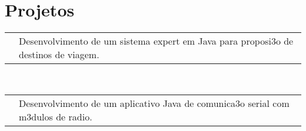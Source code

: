 \documentclass[11pt,a4paper,sans]{moderncv}
\makeatletter
\renewcommand*{\cvline}[3][.25em]{%
	  \begin{tabular}{@{}p{\hintscolumnwidth}@{\hspace{\separatorcolumnwidth}}p{\maincolumnwidth}@{}}%
          \centering\hintfont{#2} &{#3}%
	  \end{tabular}\\[#1]}
\makeatother
\begin{document}
\section{Projetos}
\cvline{Intelig\xc3\xaancia Artificial}{Desenvolvimento de um sistema expert em Java para proposi\xc3\xa7\xc3\xa3o de destinos de viagem. \newline{\emph{Implementa\xc3\xa7\xc3\xa3o dos m\xc3\xa9todos de encadeamento e desenvolvimento da interface gr\xc3\xa1\xef\xac\x81ca em Swing}} \newline{\emph{}}\ENTRYSPACE}
\cvline{Tratamento de Dados}{Desenvolvimento de um aplicativo Java de comunica\xc3\xa7\xc3\xa3o serial com m\xc3\xb3dulos de radio. \newline{\emph{Documenta\xc3\xa7\xc3\xa3o do programa e tutorial explicativo}} \newline{\emph{Controle de vers\xc3\xa3o com Git}}}
\end{document}
